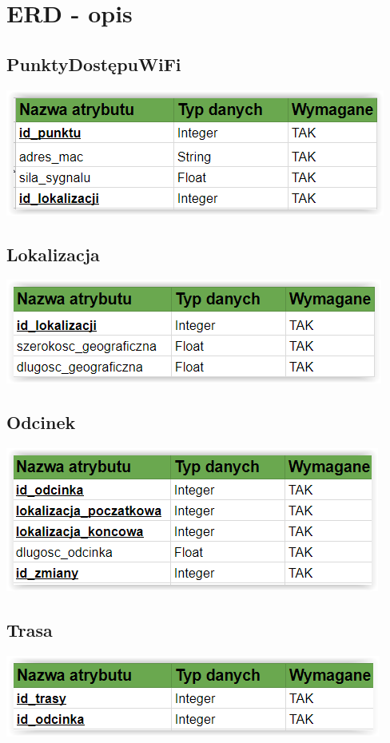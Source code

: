 \documentclass[11pt]{article}
\begin{document}
	\section{ERD - opis}
	\subsection{PunktyDostępuWiFi}
	\begin{center}
		\includegraphics[scale=1]{punktyDostepu.PNG}
	\end{center}
	\subsection{Lokalizacja}
	\begin{center}
		\includegraphics[scale=1]{Lokalizacja.PNG}
	\end{center}
	\subsection{Odcinek}
	\begin{center}
		\includegraphics[scale=1]{Odcinek.PNG}
	\end{center}
	\subsection{Trasa}
	\begin{center}
		\includegraphics[scale=1]{Trasa.PNG}
	\end{center}
\end{document}
